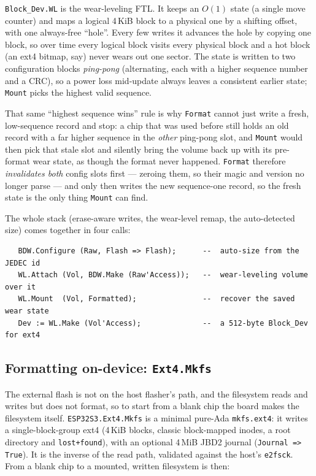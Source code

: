 \texttt{Block\_Dev.WL} is the wear-leveling FTL. It keeps an $O(1)$ state (a
single move counter) and maps a logical 4\,KiB block to a physical one by a
shifting offset, with one always-free ``hole''. Every few writes it advances the
hole by copying one block, so over time every logical block visits every physical
block and a hot block (an ext4 bitmap, say) never wears out one sector. The state
is written to two configuration blocks \emph{ping-pong} (alternating, each with a
higher sequence number and a CRC), so a power loss mid-update always leaves a
consistent earlier state; \texttt{Mount} picks the highest valid sequence.

That same ``highest sequence wins'' rule is why \texttt{Format} cannot just write a
fresh, low-sequence record and stop: a chip that was used before still holds an old
record with a far higher sequence in the \emph{other} ping-pong slot, and
\texttt{Mount} would then pick that stale slot and silently bring the volume back up
with its pre-format wear state, as though the format never happened.
\texttt{Format} therefore \emph{invalidates both} config slots first --- zeroing
them, so their magic and version no longer parse --- and only then writes the new
sequence-one record, so the fresh state is the only thing \texttt{Mount} can find.

The whole stack (erase-aware writes, the wear-level remap, the auto-detected size)
comes together in four calls:

\begin{lstlisting}
   BDW.Configure (Raw, Flash => Flash);      --  auto-size from the JEDEC id
   WL.Attach (Vol, BDW.Make (Raw'Access));   --  wear-leveling volume over it
   WL.Mount  (Vol, Formatted);               --  recover the saved wear state
   Dev := WL.Make (Vol'Access);              --  a 512-byte Block_Dev for ext4
\end{lstlisting}

\subsection{Formatting on-device: \texttt{Ext4.Mkfs}}

The external flash is not on the host flasher's path, and the filesystem reads and
writes but does not format, so to start from a blank chip the board makes the
filesystem itself. \texttt{ESP32S3.Ext4.Mkfs} is a minimal pure-Ada
\texttt{mkfs.ext4}: it writes a single-block-group ext4 (4\,KiB blocks, classic
block-mapped inodes, a root directory and \texttt{lost+found}), with an optional
4\,MiB JBD2 journal (\texttt{Journal => True}). It is the inverse of the read path,
validated against the host's \texttt{e2fsck}. From a blank chip to a mounted,
written filesystem is then:


